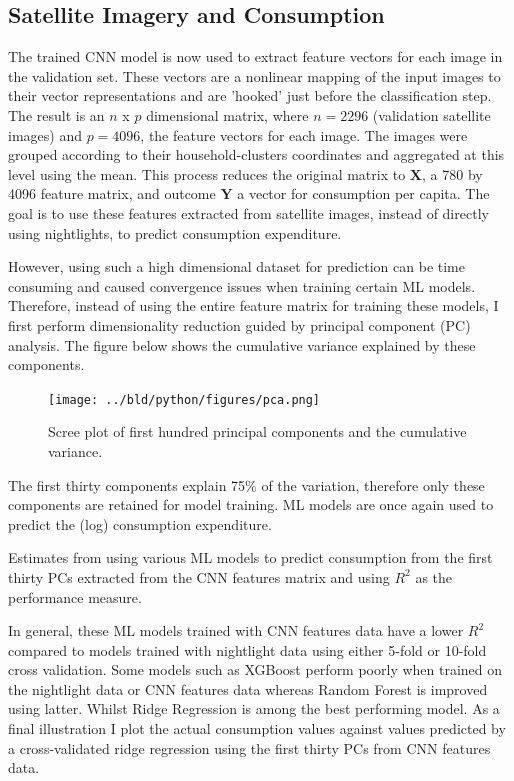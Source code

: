 \documentclass[11pt, a4paper, leqno]{article}
\begin{document}
\subsection{Satellite Imagery and Consumption}

 The trained CNN model is now used to extract feature vectors for each image in the validation set. These vectors are a nonlinear mapping of the input images to their vector representations and are 'hooked' just before the classification step. The result is an $n$ x $p$ dimensional matrix, where $n = 2296$ (validation satellite images) and $p = 4096$, the feature vectors for each image. The images were grouped according to their household-clusters coordinates and aggregated at this level using the mean. This process reduces the original matrix to $\textbf{X}$, a 780 by 4096 feature matrix, and outcome $\textbf{Y}$ a vector for consumption per capita. The goal is to use these features extracted from satellite images, instead of directly using nightlights, to predict consumption expenditure.

 However, using such a high dimensional dataset for prediction can be time consuming and caused convergence issues when training certain ML models. Therefore, instead of using the entire feature matrix for training these models, I first perform dimensionality reduction guided by principal component (PC) analysis. The figure below shows the cumulative variance explained by these components. 

\begin{figure}[H]
\centering
    \texttt{[image: ../bld/python/figures/pca.png]}
    \caption{Scree plot of first hundred principal components and the cumulative variance.}
    \label{fig:python-predictions}
\end{figure}

 The first thirty components explain 75\% of the variation, therefore only these components are retained for model training. ML models are once again used to predict the (log) consumption expenditure.

\begin{table}[H]
\centering
    \scalebox{1.1}{}
	\caption{Estimates from using various ML models to predict consumption from the first thirty PCs extracted from the CNN features matrix and using $R^2$ as the performance measure.}
\end{table}

In general, these ML models trained with CNN features data have a lower $R^2$  compared to models trained with nightlight data using either 5-fold or 10-fold cross validation. Some models such as XGBoost perform poorly when trained on the nightlight data or CNN features data whereas Random Forest is improved using latter. Whilst Ridge Regression is among the best performing model. As a final illustration I plot the actual consumption values against values predicted by a cross-validated ridge regression using the first thirty PCs from CNN features data.
\end{document}
